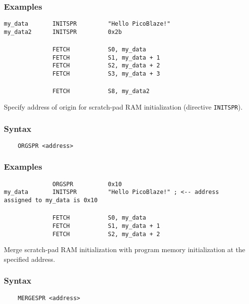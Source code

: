     \subsubsection{Examples}
        \verb'my_data       INITSPR         "Hello PicoBlaze!"'\\
        \verb'my_data2      INITSPR         0x2b'\\
        \verb''\\
        \verb'              FETCH           S0, my_data'\\
        \verb'              FETCH           S1, my_data + 1'\\
        \verb'              FETCH           S2, my_data + 2'\\
        \verb'              FETCH           S3, my_data + 3'\\
        \verb''\\
        \verb'              FETCH           S8, my_data2'

    Specify address of origin for scratch-pad RAM initialization (directive \texttt{INITSPR}).

    \subsubsection{Syntax}
        \verb'    ORGSPR <address>'

    \subsubsection{Examples}
        \verb'              ORGSPR          0x10'\\
        \verb'my_data       INITSPR         "Hello PicoBlaze!" ; <-- address assigned to my_data is 0x10'\\
        \verb''\\
        \verb'              FETCH           S0, my_data'\\
        \verb'              FETCH           S1, my_data + 1'\\
        \verb'              FETCH           S2, my_data + 2'

    Merge scratch-pad RAM initialization with program memory initialization at the specified address.

    \subsubsection{Syntax}
        \verb'    MERGESPR <address>'

